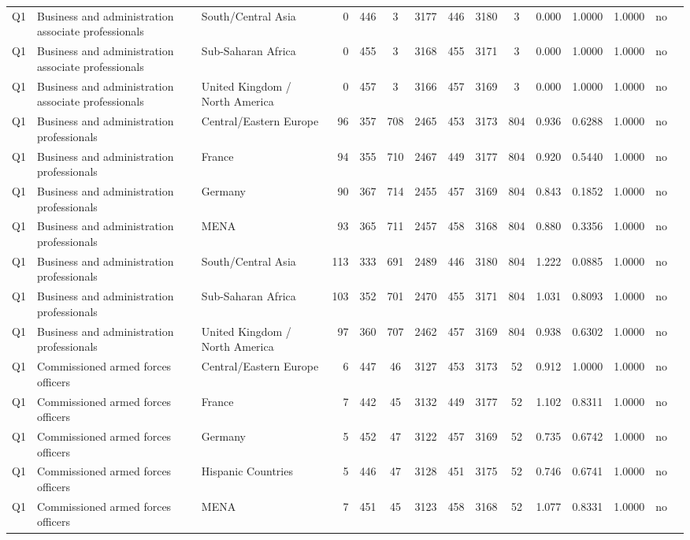 \begin{longtable}{lllrcccccccccll}
Q1 & Business and administration associate professionals & South/Central Asia & 0 & 446 & 3 & 3177 & 446 & 3180 & 3 & 0.000 & 1.0000 & 1.0000 & no \\
Q1 & Business and administration associate professionals & Sub-Saharan Africa & 0 & 455 & 3 & 3168 & 455 & 3171 & 3 & 0.000 & 1.0000 & 1.0000 & no \\
Q1 & Business and administration associate professionals & United Kingdom / North America & 0 & 457 & 3 & 3166 & 457 & 3169 & 3 & 0.000 & 1.0000 & 1.0000 & no \\
Q1 & Business and administration professionals & Central/Eastern Europe & 96 & 357 & 708 & 2465 & 453 & 3173 & 804 & 0.936 & 0.6288 & 1.0000 & no \\
Q1 & Business and administration professionals & France & 94 & 355 & 710 & 2467 & 449 & 3177 & 804 & 0.920 & 0.5440 & 1.0000 & no \\
Q1 & Business and administration professionals & Germany & 90 & 367 & 714 & 2455 & 457 & 3169 & 804 & 0.843 & 0.1852 & 1.0000 & no \\
Q1 & Business and administration professionals & MENA & 93 & 365 & 711 & 2457 & 458 & 3168 & 804 & 0.880 & 0.3356 & 1.0000 & no \\
Q1 & Business and administration professionals & South/Central Asia & 113 & 333 & 691 & 2489 & 446 & 3180 & 804 & 1.222 & 0.0885 & 1.0000 & no \\
Q1 & Business and administration professionals & Sub-Saharan Africa & 103 & 352 & 701 & 2470 & 455 & 3171 & 804 & 1.031 & 0.8093 & 1.0000 & no \\
Q1 & Business and administration professionals & United Kingdom / North America & 97 & 360 & 707 & 2462 & 457 & 3169 & 804 & 0.938 & 0.6302 & 1.0000 & no \\
Q1 & Commissioned armed forces officers & Central/Eastern Europe & 6 & 447 & 46 & 3127 & 453 & 3173 & 52 & 0.912 & 1.0000 & 1.0000 & no \\
Q1 & Commissioned armed forces officers & France & 7 & 442 & 45 & 3132 & 449 & 3177 & 52 & 1.102 & 0.8311 & 1.0000 & no \\
Q1 & Commissioned armed forces officers & Germany & 5 & 452 & 47 & 3122 & 457 & 3169 & 52 & 0.735 & 0.6742 & 1.0000 & no \\
Q1 & Commissioned armed forces officers & Hispanic Countries & 5 & 446 & 47 & 3128 & 451 & 3175 & 52 & 0.746 & 0.6741 & 1.0000 & no \\
Q1 & Commissioned armed forces officers & MENA & 7 & 451 & 45 & 3123 & 458 & 3168 & 52 & 1.077 & 0.8331 & 1.0000 & no \\

\end{longtable}

